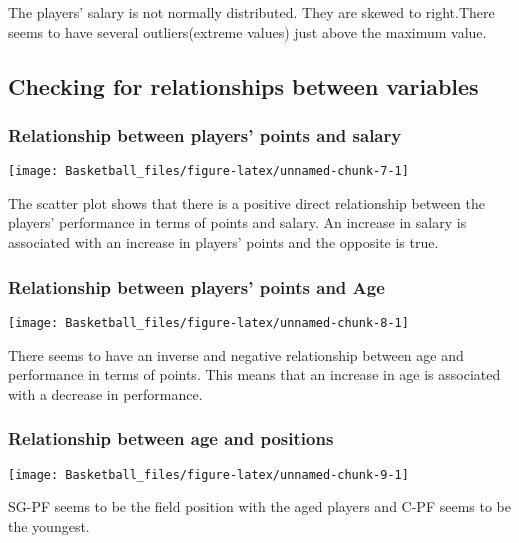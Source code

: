 \documentclass[
]{article}
\begin{document}
The players' salary is not normally distributed. They are skewed to
right.There seems to have several outliers(extreme values) just above
the maximum value.

\hypertarget{checking-for-relationships-between-variables}{%
\subsection{Checking for relationships between
variables}\label{checking-for-relationships-between-variables}}

\hypertarget{relationship-between-players-points-and-salary}{%
\subsubsection{Relationship between players' points and
salary}\label{relationship-between-players-points-and-salary}}

\texttt{[image: Basketball\_files/figure-latex/unnamed-chunk-7-1]}

The scatter plot shows that there is a positive direct relationship
between the players' performance in terms of points and salary. An
increase in salary is associated with an increase in players' points and
the opposite is true.

\hypertarget{relationship-between-players-points-and-age}{%
\subsubsection{Relationship between players' points and
Age}\label{relationship-between-players-points-and-age}}

\texttt{[image: Basketball\_files/figure-latex/unnamed-chunk-8-1]}

There seems to have an inverse and negative relationship between age and
performance in terms of points. This means that an increase in age is
associated with a decrease in performance.

\hypertarget{relationship-between-age-and-positions}{%
\subsubsection{Relationship between age and
positions}\label{relationship-between-age-and-positions}}

\texttt{[image: Basketball\_files/figure-latex/unnamed-chunk-9-1]}

SG-PF seems to be the field position with the aged players and C-PF
seems to be the youngest.
\end{document}
